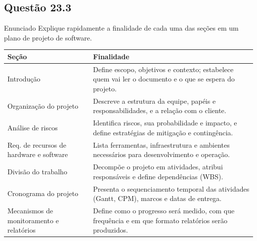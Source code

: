 \documentclass[12pt,a4paper]{article}
\begin{document}
\subsection*{Questão 23.3}
\begin{questao}{Enunciado}
Explique rapidamente a finalidade de cada uma das seções em um plano de
projeto de software.
\end{questao}
\begin{resposta}
\begin{center}
\begin{tabular}{p{4cm}p{9.5cm}}
\toprule
\textbf{Seção} & \textbf{Finalidade} \\
\midrule
Introdução & Define escopo, objetivos e contexto; estabelece quem vai ler o
             documento e o que se espera do projeto. \\
\midrule
Organização do projeto & Descreve a estrutura da equipe, papéis e responsabilidades,
                         e a relação com o cliente. \\
\midrule
Análise de riscos & Identifica riscos, sua probabilidade e impacto, e define
                    estratégias de mitigação e contingência. \\
\midrule
Req. de recursos de hardware e software & Lista ferramentas, infraestrutura e
                                          ambientes necessários para desenvolvimento
                                          e operação. \\
\midrule
Divisão do trabalho & Decompõe o projeto em atividades, atribui responsáveis
                      e define dependências (WBS). \\
\midrule
Cronograma do projeto & Presenta o sequenciamento temporal das atividades (Gantt,
                        CPM), marcos e datas de entrega. \\
\midrule
Mecanismos de monitoramento e relatórios & Define como o progresso será medido,
                                           com que frequência e em que formato
                                           relatórios serão produzidos. \\
\bottomrule
\end{tabular}
\end{center}
\end{resposta}

\end{document}
